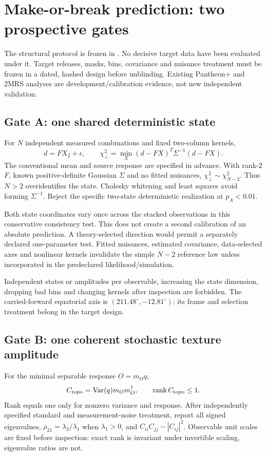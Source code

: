 \section{Make-or-break prediction: two prospective gates}
\label{sec:make-or-break}
The structural protocol is frozen in
.
No decisive target data have been evaluated under it. Target releases,
masks, bins, covariance and nuisance treatment must be frozen in a dated,
hashed design before unblinding. Existing Pantheon+ and 2MRS analyses are
development/calibration evidence, not new independent validation.

\subsection{Gate A: one shared deterministic state}
For $N$ independent measured combinations and fixed two-column kernels,
\begin{equation}
d=FX_2+\epsilon,\qquad
\chi^2_\perp=\min_X(d-FX)^T\Sigma^{-1}(d-FX).
\end{equation}
The conventional mean and source response are specified in advance.
With rank-$2$ $F$, known positive-definite Gaussian $\Sigma$ and no fitted
nuisances, $\chi^2_\perp\sim\chi^2_{N-2}$. Thus $N>2$ overidentifies the state.
Cholesky whitening and least squares avoid forming $\Sigma^{-1}$.
Reject the specific two-state deterministic realization at $p_A<0.01$.

Both state coordinates vary once across the stacked observations in this
conservative consistency test. This does not create a second calibration
of an absolute prediction. A theory-selected direction would permit a
separately declared one-parameter test. Fitted nuisances, estimated covariance,
data-selected axes and nonlinear kernels invalidate the simple $N-2$
reference law unless incorporated in the predeclared likelihood/simulation.

Independent states or amplitudes per observable, increasing the state
dimension, dropping bad bins and changing kernels after inspection are
forbidden. The carried-forward equatorial axis is
$(211.48^\circ,-12.81^\circ)$; its frame and selection treatment belong in
the target design.

\subsection{Gate B: one coherent stochastic texture amplitude}
For the minimal separable response $O=m_Oq$,
\begin{equation}
C_{\rm topo}=\operatorname{Var}(q)m_Om_O^\dagger,\qquad
\operatorname{rank}C_{\rm topo}\le1.
\end{equation}
Rank equals one only for nonzero variance and response. After independently
specified standard and measurement-noise treatment, report all signed
eigenvalues, $\rho_{21}=\lambda_2/\lambda_1$ when $\lambda_1>0$, and
$C_{ii}C_{jj}-|C_{ij}|^2$.
Observable unit scales are fixed before inspection: exact rank is invariant
under invertible scaling, eigenvalue ratios are not.

